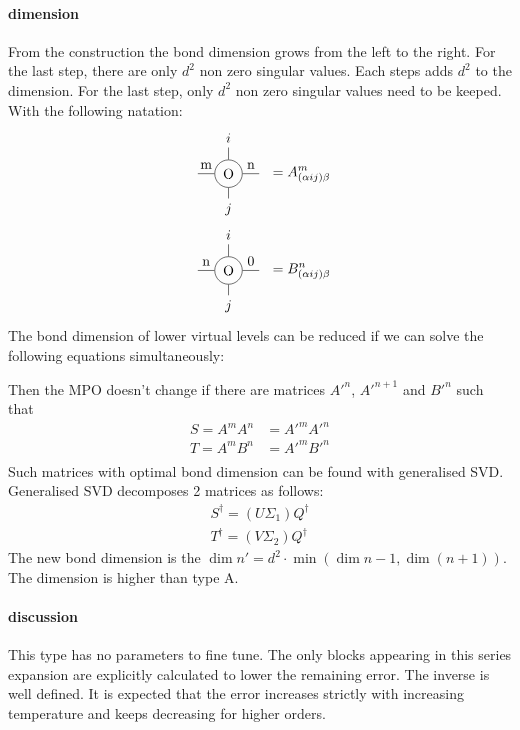 \paragraph{dimension} From the construction the bond dimension grows from the left to the right. For the last step, there are only $d^2$ non zero singular values.  Each steps adds $d^2$ to the dimension.
For the last step, only $d^2$ non zero singular values need to be keeped. With the following natation:
\begin{equation}
    \begin{split}
        \mpo{1}{ {"m","n"}  }{ { "\(i\)",}}{ { "$j$",}}{}{} &= A^m_{ (\alpha i j ) \beta} \\
        \mpo{1}{ {"n","0"}  }{ { "$i$",}}{ { "$j$",}}{}{} &= B^n_{ (\alpha i j ) \beta} \\
    \end{split}
\end{equation}
The bond dimension of lower virtual levels can be reduced if we can solve the following equations simultaneously:

Then the MPO doesn't change if there are matrices $A'^{n}$, $A'^{n+1}$ and $B'^{n}$ such that
\begin{equation}
    \begin{split}
        S=A^{m} A^{n} &= A'^{m} A'^{n} \\
        T=A^{m} B^{n} &= A'^{m} B'^{n} \\
    \end{split}
\end{equation}
Such matrices with optimal bond dimension can be found with generalised SVD. Generalised SVD decomposes 2 matrices as follows:
\begin{equation}
    \begin{split}
        S^{\dagger} = (U \Sigma_1) Q^{\dagger} \\
        T^{\dagger} = (V \Sigma_2) Q^{\dagger}
    \end{split}
\end{equation}
The new bond dimension is the $\dim{n'} =d^2 \cdot \min( \dim{n-1}, \dim (n+1) )$.  The dimension is higher than type A.


\paragraph{discussion}

This type has no parameters to fine tune. The only blocks appearing in this series expansion are explicitly calculated to lower the remaining error. The inverse is well defined. It is expected that the error increases strictly with increasing temperature and keeps decreasing for higher orders.

